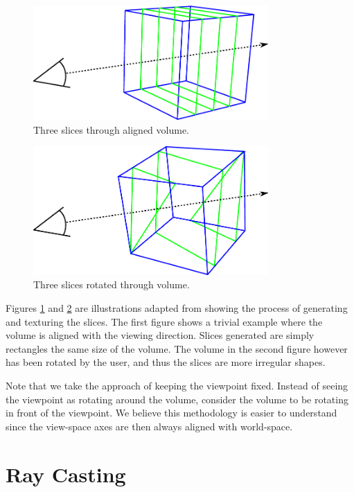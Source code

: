\documentclass{article}
\begin{document}
\begin{figure}
\centering
\includegraphics[width=0.8\textwidth]{slicing-aligned.pdf}
\caption{Three slices through aligned volume.}
\label{slicing-aligned}
\end{figure}

\begin{figure}
\centering
\includegraphics[width=0.8\textwidth]{slicing-rotated.pdf}
\caption{Three slices rotated through volume.}
\label{slicing-rotated}
\end{figure}

Figures \ref{slicing-aligned} and \ref{slicing-rotated} are illustrations
adapted from \cite{Ikits04} showing the process of generating and texturing the
slices.  The first figure shows a trivial example where the volume is aligned
with the viewing direction.  Slices generated are simply rectangles the same
size of the volume.  The volume in the second figure however has been rotated by
the user, and thus the slices are more irregular shapes.

Note that we take the approach of keeping the viewpoint fixed.  Instead of
seeing the viewpoint as rotating around the volume, consider the volume to be
rotating in front of the viewpoint.  We believe this methodology is easier to
understand since the view-space axes are then always aligned with world-space.

\section{Ray Casting}
\end{document}
